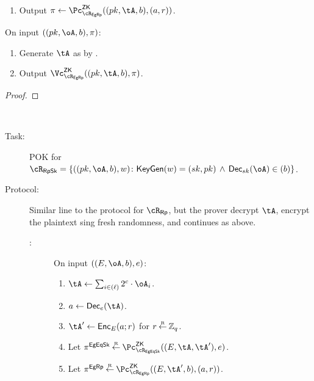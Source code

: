 \begin{description}
\begin{description}
\begin{description}
\begin{enumerate}
        \item  Output $\pi \asn \pZK{\rEgRp}((\pk,\tA,b), (a,r))$.
        
	\end{enumerate}
	
	
\item[\Vc:] On input $((\pk,\oA,b),\pi)$:
	
	\begin{enumerate}
		\item   Generate $\tA$ as by \Pc.
		\item  Output $\vZK{\rEgRp}((\pk,\tA,b), \pi)$.
		
	\end{enumerate}
	
\end{description}
\end{description}

		\begin{proof}
		\end{proof}
\item[In-range proof using sceret key.]~  

\begin{description}
	\item[Task:] POK for $\rRpSk =\rRpSkDef$.
	
	
	\item[Protocol:] Similar line to the protocol for $\rRp$, but  the prover  decrypt $\tA$, encrypt the plaintext sing  fresh randomness, and continues as above.
	
	
	\begin{description}
		\item[\Pc:] On input $((E,\oA,b),e)$:
		
		\begin{enumerate}
		
			\item    $\tA \asn  \sum_{i\in (\ell)}    2^c \cdot \oA_i$. 
			
			\item   $a \asn  \Dec_e(\tA)$.
			
			\item   $\tA' \asn \Enc_E(a;r)$ for $r\mathbin{\stackrel{\mbox{\tiny R}}{\leftarrow}} {\mathbb Z}_q$.
			
				
			
			\item  Let  $\pi^\EgEqSkS \getsr \pZK{\rEgEqSk}((E,\tA,\tA'
			), e)$.
				
			\item  Let  $\pi^\EgRps \getsr \pZK{\rEgRp}((E,\tA',b), (a,r))$.
			

\end{enumerate}
\end{description}
\end{description}
\end{description}
